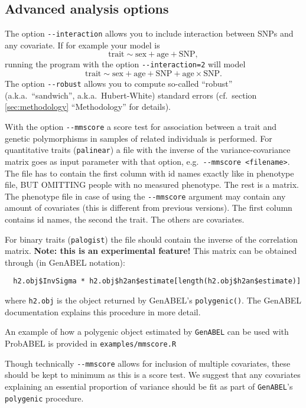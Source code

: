 \documentclass[12pt,a4paper]{article}
\newcommand{\GA}{\texttt{GenABEL}}
\begin{document}
\subsection{Advanced analysis options}
The option \lstinline{--interaction} allows you to include interaction
between SNPs and any covariate. If for example your model is
\begin{equation*}
  \textrm{trait} \sim \textrm{sex} + \textrm{age} + \textrm{SNP},
\end{equation*}
running the program with the option \lstinline{--interaction=2} will model
\begin{equation*}
  \textrm{trait} \sim \textrm{sex} + \textrm{age} + \textrm{SNP} +
  \textrm{age} \times \mathrm{SNP}.
\end{equation*}
The option \lstinline{--robust} allows you to compute so-called
``robust'' (a.k.a.~``sandwich'', a.k.a.~Hubert-White) standard errors
(cf.~section \ref{sec:methodology} ``Methodology'' for details).

With the option \lstinline{--mmscore} a score test for association
between a trait and genetic polymorphisms in samples of related
individuals is performed. For quantitative traits (\texttt{palinear})
a file with the inverse of the variance-covariance matrix goes as input
parameter with that option, e.g.~\lstinline{--mmscore <filename>}. The
file has to contain the first column with id names exactly like in
phenotype file, BUT OMITTING people with no measured phenotype. The
rest is a matrix. The phenotype file in case of using the
\lstinline{--mmscore} argument may contain any amount of covariates (this
is different from previous versions). The first column contains id
names, the second the trait. The others are covariates.

For binary traits (\texttt{palogist}) the file should contain the
inverse of the correlation matrix. \textbf{Note: this is an
  experimental feature!} This matrix can be obtained through (in
GenABEL notation):
\begin{verbatim}
  h2.obj$InvSigma * h2.obj$h2an$estimate[length(h2.obj$h2an$estimate)]
\end{verbatim}
where \texttt{h2.obj} is the object returned by GenABEL's
\texttt{polygenic()}. The GenABEL documentation explains this
procedure in more detail.

An example of how a polygenic object estimated by \GA{} can be used
with ProbABEL is provided in \texttt{examples/mmscore.R}

Though technically \lstinline{--mmscore} allows for inclusion of multiple
covariates, these should be kept to minimum as this is a score test. We
suggest that any covariates explaining an essential proportion of
variance should be fit as part of \GA{}'s
\texttt{polygenic} procedure.
\end{document}

